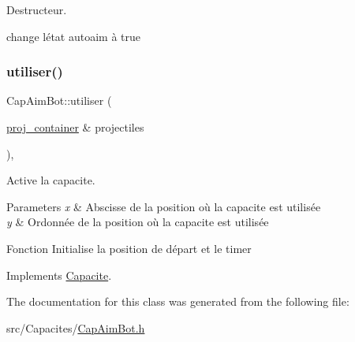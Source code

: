 Destructeur. 

change l\textquotesingle{}état autoaim à true \mbox{\label{class_cap_aim_bot_ad94e41d0b328576b74e802935450c0ad}} 
\subsubsection{\texorpdfstring{utiliser()}{utiliser()}}
{\footnotesize\ttfamily Cap\+Aim\+Bot\+::utiliser (\begin{DoxyParamCaption}\item[{\mbox{\hyperlink{def__type_8h_a87980cd8ee9533e561a73e8bbc728188}{proj\+\_\+container}} \&}]{projectiles }\end{DoxyParamCaption})\hspace{0.3cm}{\ttfamily [override]}, {\ttfamily [virtual]}}



Active la capacite. 


\begin{DoxyParams}{Parameters}
{\em x} & Abscisse de la position où la capacite est utilisée \\
\hline
{\em y} & Ordonnée de la position où la capacite est utilisée\\
\hline
\end{DoxyParams}
Fonction Initialise la position de départ et le timer 

Implements \mbox{\hyperlink{class_capacite_abac1434e2ac3ecc9e5afdafd9a7a4bed}{Capacite}}.



The documentation for this class was generated from the following file\+:\begin{DoxyCompactItemize}
\item 
src/\+Capacites/\mbox{\hyperlink{_cap_aim_bot_8h}{Cap\+Aim\+Bot.\+h}}\end{DoxyCompactItemize}
